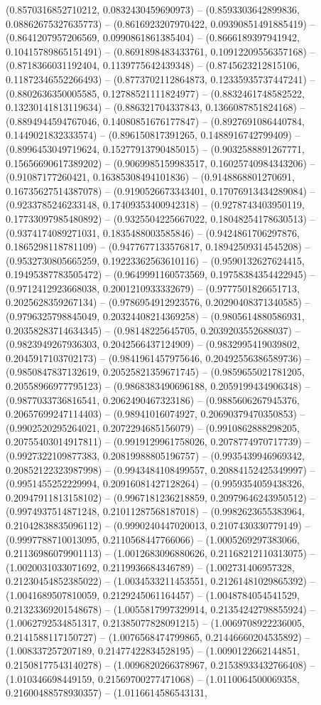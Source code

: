 (0.8570316852710212, 0.0832430459690973) -- (0.8593303642899836, 0.08862675327635773) -- (0.8616923207970422, 0.09390851491885419) -- (0.8641207957206569, 0.0990861861385404) -- (0.8666189397941942, 0.10415789865151491) -- (0.8691898483433761, 0.10912209556357168) -- (0.8718366031192404, 0.1139775642439348) -- (0.8745623212815106, 0.11872346552266493) -- (0.8773702112864873, 0.12335935737447241) -- (0.8802636350005585, 0.12788521111824977) -- (0.8832461748582522, 0.13230141813119634) -- (0.886321704337843, 0.1366087851824168) -- (0.8894944594767046, 0.14080851676177847) -- (0.8927691086440784, 0.1449021832333574) -- (0.896150817391265, 0.1488916742799409) -- (0.8996453049719624, 0.15277913790485015) -- (0.9032588891267771, 0.15656690617389202) -- (0.9069985159983517, 0.16025740984343206) -- (0.91087177260421, 0.16385308494101836) -- (0.9148868801270691, 0.16735627514387078) -- (0.9190526673343401, 0.17076913434289084) -- (0.9233785246233148, 0.17409353400942318) -- (0.9278743403950119, 0.17733097985480892) -- (0.9325504225667022, 0.18048254178630513) -- (0.9374174089271031, 0.1835488003585846) -- (0.9424861706297876, 0.1865298118781109) -- (0.9477677133576817, 0.18942509314545208) -- (0.9532730805665259, 0.19223362563610116) -- (0.9590132627624415, 0.19495387783505472) -- (0.9649991160573569, 0.19758384354422945) -- (0.9712412923668038, 0.2001210933332679) -- (0.9777501826651713, 0.2025628359267134) -- (0.9786954912923576, 0.20290408371340585) -- (0.9796325798845049, 0.20324408214369258) -- (0.9805614880586931, 0.20358283714634345) -- (0.98148225645705, 0.2039203552688037) -- (0.9823949267936303, 0.2042566437124909) -- (0.9832995419039802, 0.2045917103702173) -- (0.9841961457975646, 0.20492556386589736) -- (0.9850847837132619, 0.20525821359671745) -- (0.9859655021781205, 0.20558966977795123) -- (0.9868383490696188, 0.2059199434906348) -- (0.9877033736816541, 0.2062490467323186) -- (0.9885606267945376, 0.20657699247114403) -- (0.98941016074927, 0.20690379470350853) -- (0.9902520295264021, 0.2072294685156079) -- (0.9910862888298205, 0.20755403014917811) -- (0.9919129961758026, 0.2078774970717739) -- (0.9927322109877383, 0.20819988805196757) -- (0.9935439946969342, 0.20852122323987998) -- (0.9943484108499557, 0.20884152425349997) -- (0.9951455252229994, 0.20916081427128264) -- (0.9959354059438326, 0.20947911813158102) -- (0.9967181236218859, 0.20979646243950512) -- (0.9974937514871248, 0.21011287568187018) -- (0.9982623655383964, 0.21042838835096112) -- (0.9990240447020013, 0.2107430330779149) -- (0.9997788710013095, 0.2110568447766066) -- (1.0005269297383066, 0.21136986079901113) -- (1.0012683096880626, 0.21168212110313075) -- (1.0020031033071692, 0.2119936684346789) -- (1.002731406957328, 0.21230454852385022) -- (1.0034533211453551, 0.21261481029865392) -- (1.0041689507810059, 0.2129245061164457) -- (1.0048784054541529, 0.21323369201548678) -- (1.0055817997329914, 0.21354242798855924) -- (1.0062792534851317, 0.21385077828091215) -- (1.0069708922236005, 0.2141588117150727) -- (1.0076568474799865, 0.21446660204535892) -- (1.008337257207189, 0.21477422834528195) -- (1.0090122662144851, 0.21508177543140278) -- (1.0096820266378967, 0.21538933432766408) -- (1.010346698449159, 0.21569700277471068) -- (1.0110064500069358, 0.21600488578930357) -- (1.0116614586543131, 